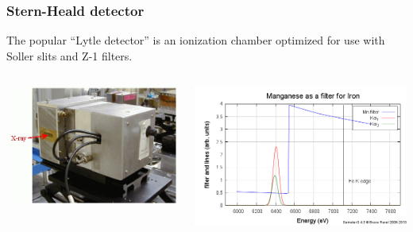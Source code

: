 \documentclass[10pt, xcolor=x11names, compress]{beamer}
\begin{document}
\begin{frame}
  \frametitle{Stern-Heald detector}

  The popular ``Lytle detector'' is an ionization chamber optimized
  for use with Soller slits and Z-1 filters.

  \medskip

  \begin{columns}
    \begin{column}{0.5\linewidth}
      \includegraphics[width=\linewidth]{exp/lytle.jpg}
    \end{column}
    \begin{column}{0.5\linewidth}
      \includegraphics[width=\linewidth]{exp/filter.png}
    \end{column}
  \end{columns}

  \medskip


\end{frame}
\end{document}
